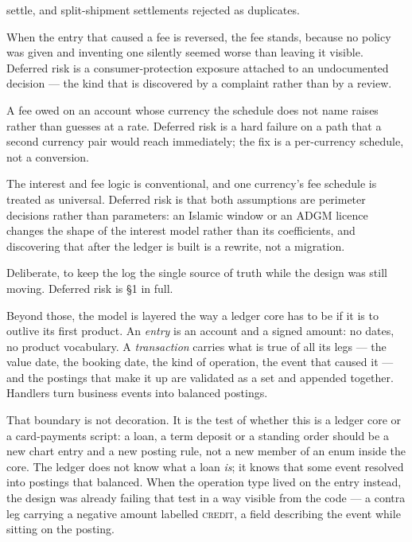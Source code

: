 \documentclass[10pt,a4paper]{article}
\newcommand{\term}[1]{\textit{#1}}
\begin{document}
\begin{description}
        settle, and split-shipment settlements rejected as duplicates.
  \item[No fee-reversal policy.] When the entry that caused a fee is reversed,
        the fee stands, because no policy was given and inventing one silently
        seemed worse than leaving it visible. Deferred risk is a
        consumer-protection exposure attached to an undocumented decision ---
        the kind that is discovered by a complaint rather than by a review.
  \item[Single-currency fee schedule, no FX.] A fee owed on an account whose
        currency the schedule does not name raises rather than guesses at a
        rate. Deferred risk is a hard failure on a path that a second currency
        pair would reach immediately; the fix is a per-currency schedule, not a
        conversion.
  \item[A single licence and a single fee schedule assumed.] The interest and
        fee logic is conventional, and one currency's fee schedule is treated
        as universal. Deferred risk is that both assumptions are perimeter
        decisions rather than parameters: an Islamic window or an ADGM licence
        changes the shape of the interest model rather than its coefficients,
        and discovering that after the ledger is built is a rewrite, not a
        migration.
  \item[$O(N)$ balance derivation and no checkpointing.] Deliberate, to keep
        the log the single source of truth while the design was still moving.
        Deferred risk is \S1 in full.
\end{description}

Beyond those, the model is layered the way a ledger core has to be if it is to
outlive its first product. An \term{entry} is an account and a signed amount:
no dates, no product vocabulary. A \term{transaction} carries what is true of
all its legs --- the value date, the booking date, the kind of operation, the
event that caused it --- and the postings that make it up are validated as a
set and appended together. Handlers turn business events into balanced
postings.

That boundary is not decoration. It is the test of whether this is a ledger
core or a card-payments script: a loan, a term deposit or a standing order
should be a new chart entry and a new posting rule, not a new member of an
enum inside the core. The ledger does not know what a loan \term{is}; it knows
that some event resolved into postings that balanced. When the operation type
lived on the entry instead, the design was already failing that test in a way
visible from the code --- a contra leg carrying a negative amount labelled
\textsc{credit}, a field describing the event while sitting on the posting.
\end{document}
